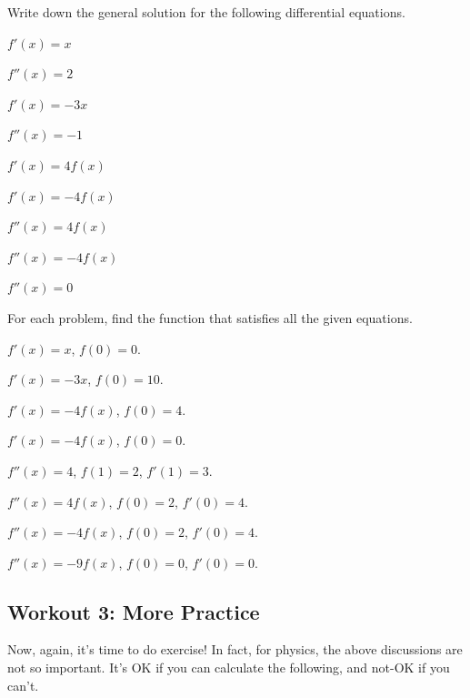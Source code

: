 \documentclass[11pt,pdfa,lastpage]{MishoNote}
\begin{document}
\begin{enumerate}[resume]
  \itemB Write down the general solution for the following differential equations.
  \begin{menumerate}{3}
    \item $f'(x)=x$
    \item $f''(x)=2$
    \item $f'(x)=-3x$
    \item $f''(x)=-1$
    \item $f'(x)=4f(x)$
    \item $f'(x)=-4f(x)$
    \item $f''(x)=4f(x)$
    \item $f''(x)=-4f(x)$
    \item $f''(x)=0$
  \end{menumerate}
  \itemB For each problem, find the function that satisfies all the given equations.
  \begin{menumerate}{2}
    \item $f'(x)=x$, $f(0)=0$.
    \item $f'(x)=-3x$, $f(0)=10$.
    \item $f'(x)=-4f(x)$, $f(0)=4$.
    \item $f'(x)=-4f(x)$, $f(0)=0$.
    \item $f''(x)=4$, $f(1)=2$, $f'(1)=3$.
    \item $f''(x)=4f(x)$, $f(0)=2$, $f'(0)=4$.
    \item $f''(x)=-4f(x)$, $f(0)=2$, $f'(0)=4$.
    \item $f''(x)=-9f(x)$, $f(0)=0$, $f'(0)=0$.
  \end{menumerate}
\end{enumerate}

\subsection{Workout 3: More Practice}
Now, again, it's time to do exercise! In fact, for physics, the above discussions are not so important. It's OK if you can calculate the following, and not-OK if you can't.
\end{document}
